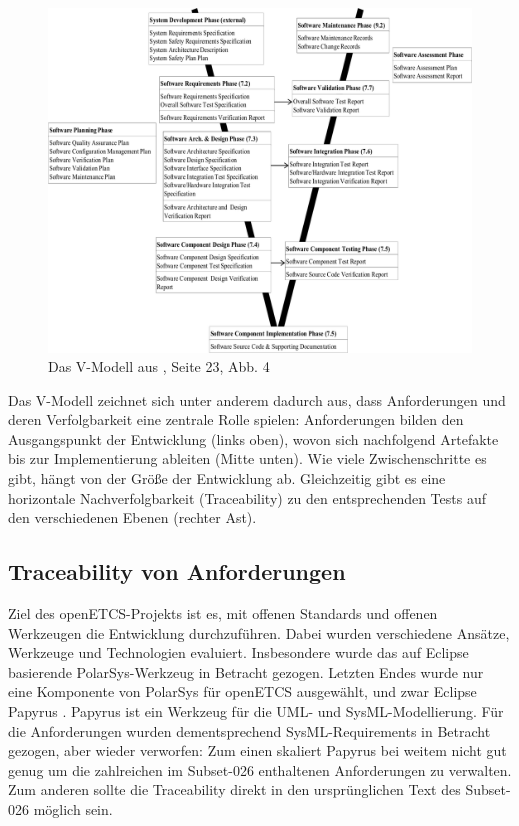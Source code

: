\documentclass[twoside]{article}
\begin{document}
\begin{multicols}{2}
\begin{figure}
\centering
\includegraphics[width=0.8\linewidth]{img/v-modell.png}
\caption{{Das V-Modell aus \cite{en50128}, Seite 23, Abb. 4}}
\label{fig:v-modell}
\end{figure}

Das V-Modell zeichnet sich unter anderem dadurch aus, dass Anforderungen und deren Verfolgbarkeit eine zentrale Rolle spielen: Anforderungen bilden den Ausgangspunkt der Entwicklung (\glqq{}links oben\grqq{}), wovon sich nachfolgend Artefakte bis zur Implementierung ableiten (\glqq{}Mitte unten\grqq{}). Wie viele Zwischenschritte es gibt, hängt von der Größe der Entwicklung ab.  Gleichzeitig gibt es eine \glqq{}horizontale\grqq{} Nachverfolgbarkeit (Traceability) zu den entsprechenden Tests auf den verschiedenen Ebenen (\glqq{}rechter Ast\grqq{}).

\subsection{Traceability von Anforderungen}
\label{sec:traceability}

Ziel des openETCS-Projekts ist es, mit offenen Standards und offenen Werkzeugen die Entwicklung durchzuführen.  Dabei wurden verschiedene Ansätze, Werkzeuge und Technologien evaluiert.  Insbesondere wurde das auf Eclipse basierende PolarSys-Werkzeug \cite{polarsys} in Betracht gezogen.  Letzten Endes wurde nur eine Komponente von PolarSys für openETCS ausgewählt, und zwar Eclipse Papyrus \cite{papyrus}.  Papyrus ist ein Werkzeug für die UML- und SysML-Modellierung.  Für die Anforderungen wurden dementsprechend SysML-Requirements in Betracht gezogen, aber wieder verworfen: Zum einen skaliert Papyrus bei weitem nicht gut genug um die zahlreichen im Subset-026 enthaltenen Anforderungen zu verwalten.  Zum anderen sollte die Traceability direkt in den ursprünglichen Text des Subset-026 möglich sein.


\end{multicols}
\end{document}
